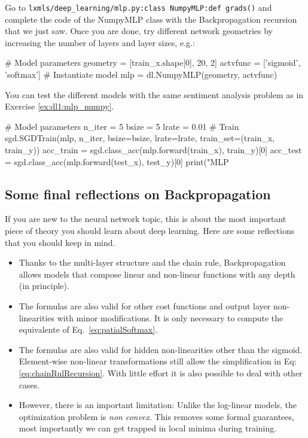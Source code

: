 \begin{exercise}\label{ex:dl1:grads}
Go to \texttt{lxmls/deep\_learning/mlp.py:class NumpyMLP:def grads()} and complete the
code of the NumpyMLP class with the Backpropagation recursion that we just saw.
Once you are done, try different network geometries by increasing the number of
layers and layer sizes, e.g.:
\begin{python}
# Model parameters
geometry = [train_x.shape[0], 20, 2]
actvfunc = ['sigmoid', 'softmax'] 
# Instantiate model
mlp      = dl.NumpyMLP(geometry, actvfunc) 
\end{python}
You can test the different models with the same sentiment analysis problem as
in Exercise \ref{ex:dl1:mlp_numpy}.
\begin{python}
# Model parameters
n_iter = 5
bsize  = 5
lrate  = 0.01
# Train
sgd.SGDTrain(mlp, n_iter, bsize=bsize, lrate=lrate, train_set=(train_x, train_y))
acc_train = sgd.class_acc(mlp.forward(train_x), train_y)[0]
acc_test  = sgd.class_acc(mlp.forward(test_x), test_y)[0]
print("MLP %
\end{python}
\end{exercise}


\subsection{Some final reflections on Backpropagation}

If you are new to the neural network topic, this is about the most important
piece of theory you should learn about deep learning. Here are some reflections
that you should keep in mind.

\begin{itemize}
\item Thanks to the multi-layer structure and the chain rule, Backpropagation allows models that compose linear and non-linear functions with any depth (in principle\footnotemark). 

\item The formulas are also valid for other cost functions and output layer non-linearities with minor modifications. It is only necessary to compute the equivalente of Eq.~\ref{eq:patialSoftmax}. 

\item The formulas are also valid for hidden non-linearities other than the sigmoid. Element-wise non-linear transformations still allow the simplification in Eq: \ref{eq:chainRulRecursion}. With little effort it is also possible to deal with other cases.

\item However, there is an important limitation: Unlike the log-linear models, the optimization problem is \textit{non convex}. This removes some formal guarantees, most importantly we can get trapped in local minima during training.
\end{itemize}

